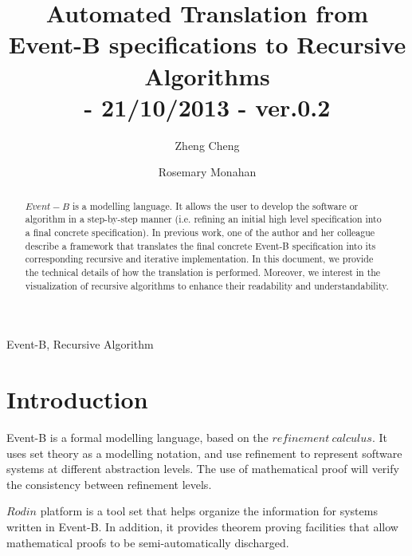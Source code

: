\documentclass{easychair}
\newenvironment{keywords}{
       \list{}{\advance\topsep by0.35cm\relax\small
       \leftmargin=1cm
       \labelwidth=0.35cm
       \listparindent=0.35cm
       \itemindent\listparindent
       \rightmargin\leftmargin}\item[\hskip\labelsep
                                     \bfseries Keywords:]}
     {\endlist}
\begin{document}
\pagestyle{plain}

\title{Automated Translation from Event-B specifications to Recursive Algorithms
\\\small{- 21/10/2013 - ver.0.2} 
}
\author{
Zheng Cheng \and
Rosemary Monahan 
}


\maketitle  

\begin{abstract}
$Event-B$ is a modelling language. It allows the user to develop the software or algorithm in a step-by-step manner (i.e. refining an initial high level specification into a final concrete specification). In previous work, one of the author and her colleague describe a framework that translates the final concrete Event-B specification into its corresponding recursive and iterative implementation. In this document, we provide the technical details of how the translation is performed. Moreover, we interest in the visualization of recursive algorithms to enhance their readability and understandability.
 
\end{abstract}   

\begin{keywords}
 Event-B,
 Recursive Algorithm
\end{keywords}

\section{Introduction} %
Event-B is a formal modelling language, based on the $refinement\ calculus$. It uses set theory as a modelling notation, and use refinement to represent software systems at different abstraction levels. The use of mathematical proof will verify the consistency between refinement levels.

$Rodin$ platform is a tool set that helps organize the information for systems written in Event-B. In addition, it provides theorem proving facilities that allow mathematical proofs to be semi-automatically discharged.
\end{document}
